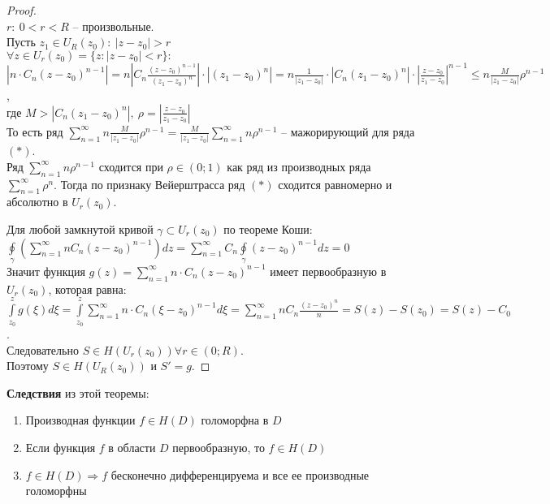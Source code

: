 \begin{proof}
    \ \\
    $r: \ 0<r<R$ -- произвольные.\\
    Пусть $z_1 \in U_R(z_0): \ |z-z_0| > r$\\
    $\forall z \in U_r(z_0) = \{z: |z-z_0|<r\}:$\\
    $|n\cdot C_n(z-z_0)^{n-1}| = n\left|C_n\frac{(z-z_0)^{n-1}}{(z_1-z_0)^n}\right|\cdot |(z_1-z_0)^n|=n\frac{1}{|z_1-z_0|}\cdot |C_n (z_1-z_0)^n|\cdot \left|\frac{z-z_0}{z_1-z_0}\right|^{n-1}\leq n\frac{M}{|z_1-z_0|}\rho^{n-1}$,\\
    где $M > |C_n (z_1-z_0)^n|, \ \rho = \left|\frac{z-z_0}{z_1-z_0}\right|$\\
    То есть ряд $\sum_{n=1}^\infty n\frac{M}{|z_1-z_0|}\rho^{n-1}=\frac{M}{|z_1-z_0|}\sum_{n=1}^\infty n\rho^{n-1}$ -- мажорирующий для ряда $(*)$.\\
    Ряд $\sum_{n=1}^\infty n\rho^{n-1}$ сходится при $\rho \in (0; 1)$ как ряд из производных ряда $\sum_{n=1}^\infty\rho^n$. Тогда по признаку Вейерштрасса ряд $(*)$ сходится равномерно и абсолютно в $U_r(z_0)$.

    Для любой замкнутой кривой $\gamma \subset U_r(z_0)$ по теореме Коши:\\
    $\oint\limits_{\gamma}\left( \sum_{n=1}^\infty n C_n (z-z_0)^{n-1} \right)dz=\sum_{n=1}^\infty C_n \oint\limits_{\gamma}(z-z_0)^{n-1}dz=0$\\
    Значит функция $g(z)=\sum_{n=1}^\infty n\cdot C_n(z-z_0)^{n-1}$ имеет первообразную в $U_r(z_0)$, которая равна:\\
    $\int\limits_{z_0}^z g(\xi)d\xi = \int\limits_{z_0}^z\sum_{n=1}^{\infty} n\cdot C_n (\xi-z_0)^{n-1}d\xi=\sum_{n=1}^{\infty} n C_n \frac{(z-z_0)^n}{n} = S(z)-S(z_0) = S(z)-C_0$.\\
    Следовательно $S \in H(U_r(z_0)) \forall r \in (0; R)$.\\
    Поэтому $S \in H(U_R(z_0))$ и $S'=g$.
\end{proof}

\textbf{Следствия} из этой теоремы:
\begin{enumerate}
    \item Производная функции $f\in H(D)$ голоморфна в $D$
    \item Если функция $f$ в области $D$ первообразную, то $f \in H(D)$
    \item $f \in H(D) \Rightarrow f$ бесконечно дифференцируема и все ее производные голоморфны
\end{enumerate}
